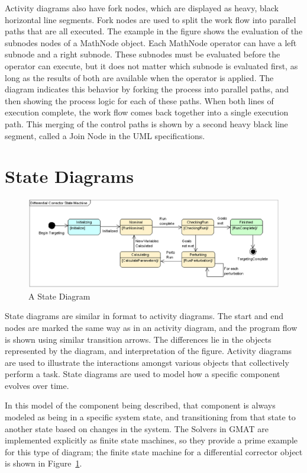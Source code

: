 Activity diagrams also have fork nodes, which are displayed as heavy, black horizontal line
segments.  Fork nodes are used to split the work flow into parallel paths that are all executed. 
The example in the figure shows the evaluation of the subnodes nodes of a MathNode object.  Each
MathNode operator can have a left subnode and a right subnode.  These subnodes must be evaluated
before the operator can execute, but it does not matter which subnode is evaluated first, as long as
the results of both are available when the operator is applied.  The diagram indicates this behavior
by forking the process into parallel paths, and then showing the process logic for each of these
paths.  When both lines of execution complete, the work flow comes back together into a single
execution path.  This merging of the control paths is shown by a second heavy black line segment,
called a Join Node in the UML specifications.

\section{State Diagrams}

\begin{figure}[htb]
\begin{center}
\includegraphics[scale=0.5]{Images/UmlStateSample.eps}
\caption{\label{figure:UmlStateExample}A State Diagram}
\end{center}
\end{figure}

State diagrams are similar in format to activity diagrams.  The start and end nodes are marked the
same way as in an activity diagram, and the program flow is shown using similar transition arrows. 
The differences lie in the objects represented by the diagram, and interpretation of the figure. 
Activity diagrams are used to illustrate the interactions amongst various objects that collectively
perform a task.  State diagrams are used to model how a specific component evolves over time.

In this model of the component being described, that component is always modeled as being in a
specific system state, and transitioning from that state to another state based on changes in the
system.  The Solvers in GMAT are implemented explicitly as finite state machines, so they provide a
prime example for this type of diagram; the finite state machine for a differential corrector object
is shown in Figure~\ref{figure:UmlStateExample}.

